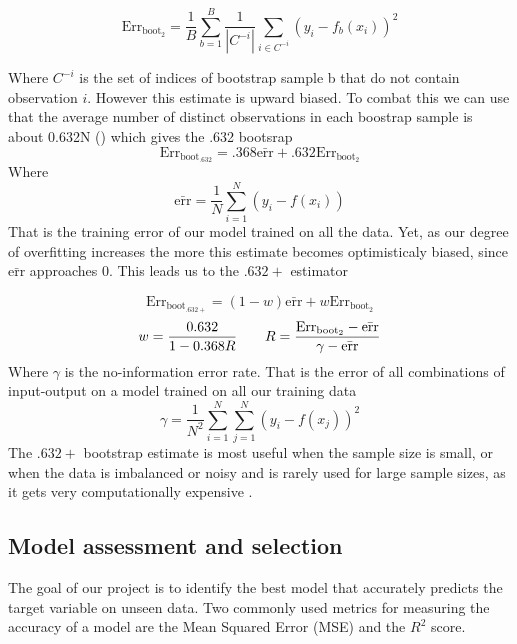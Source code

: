 \documentclass{article}
\begin{document}
\begin{equation*}
    \text{Err}_{\text{boot}_2} =  \frac{1}{B} \sum_{b=1}^B \frac{1}{|C^{-i}|} \sum_{i \in C^{-i}} (y_i - f_b(x_i))^2
\end{equation*}

Where $C^{-i}$ is the set of indices of bootstrap sample b that do not contain
observation $i$. However this estimate is upward biased. To combat this we can use that the average number of distinct observations in each boostrap sample is about 0.632N (\cite[p.~270]{Hastie2009}) which gives the .632 bootsrap
\begin{equation*}
    \text{Err}_{\text{boot}_{.632}} = .368\bar{\text{err}} + .632 \text{Err}_{\text{boot}_2}
\end{equation*}
Where
\begin{equation*}
    \bar{\text{err}} = \frac{1}{N} \sum_{i=1}^{N} (y_i - f(x_i))
\end{equation*}
That is the training error of our model trained on all the data. Yet, as our degree of overfitting increases the more this estimate becomes optimisticaly biased, since $\bar{\text{err}}$ approaches 0.
This leads us to the $.632+$ estimator

\begin{equation*}
    \text{Err}_{\text{boot}_{.632+}} = (1-w)\bar{\text{err}} + w \text{Err}_{\text{boot}_2}
\end{equation*}
\begin{equation*}
    w  = \frac{0.632}{1-0.368R} \hspace{7mm} R = \frac{\text{Err}_{\text{boot}_2}- \bar{\text{err}}}{\gamma - \bar{\text{err}}}
\end{equation*}
Where $\gamma$ is the no-information error rate. That is the error of all combinations of input-output on a model trained on all our training data
\begin{equation*}
    \gamma = \frac{1}{N^2} \sum_{i= 1}^{N}\sum_{j = 1}^{N} (y_i - f(x_j))^2
\end{equation*}
The $.632+$ bootstrap estimate is most useful when the sample size is small, or when the data is imbalanced or noisy and is rarely used for large sample sizes, as it gets very computationally expensive \cite[p. ~271]{Hastie2009}.

\subsection{Model assessment and selection}
The goal of our project is to identify the best model that accurately predicts the target variable on unseen data. Two commonly used metrics for measuring the accuracy of a model are the Mean Squared Error (MSE) and the $R^2$ score.
\end{document}
